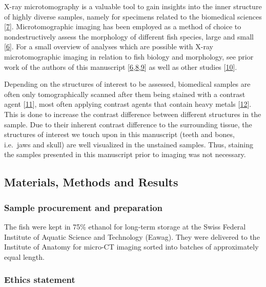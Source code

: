 X-ray microtomography is a valuable tool to gain insights into the inner structure of highly diverse samples, namely for specimens related to the biomedical sciences {[}\protect\hyperlink{ref-IKVBgaCE}{7}{]}.
Microtomographic imaging has been employed as a method of choice to nondestructively assess the morphology of different fish species, large and small {[}\protect\hyperlink{ref-19h9vxsYG}{6}{]}.
For a small overview of analyses which are possible with X-ray microtomographic imaging in relation to fish biology and morphology, see prior work of the authors of this manuscript {[}\protect\hyperlink{ref-19h9vxsYG}{6},\protect\hyperlink{ref-8Pmc2mI8}{8},\protect\hyperlink{ref-BDrCSu8p}{9}{]} as well as other studies {[}\protect\hyperlink{ref-3rxGCEvJ}{10}{]}.

Depending on the structures of interest to be assessed, biomedical samples are often only tomographically scanned after them being stained with a contrast agent {[}\protect\hyperlink{ref-pN1S9E5p}{11}{]}, most often applying contrast agents that contain heavy metals {[}\protect\hyperlink{ref-kkBa4qNV}{12}{]}.
This is done to increase the contrast difference between different structures in the sample.
Due to their inherent contrast difference to the surrounding tissue, the structures of interest we touch upon in this manuscript (teeth and bones, i.e.~jaws and skull) are well visualized in the unstained samples.
Thus, staining the samples presented in this manuscript prior to imaging was not necessary.

\hypertarget{materials-methods-and-results}{%
\subsection{Materials, Methods and Results}\label{materials-methods-and-results}}

\hypertarget{sample-procurement-and-preparation}{%
\subsubsection{Sample procurement and preparation}\label{sample-procurement-and-preparation}}

The fish were kept in 75\% ethanol for long-term storage at the Swiss Federal Institute of Aquatic Science and Technology (Eawag).
They were delivered to the Institute of Anatomy for micro-CT imaging sorted into batches of approximately equal length.

\hypertarget{ethics-statement}{%
\subsubsection{Ethics statement}\label{ethics-statement}}

